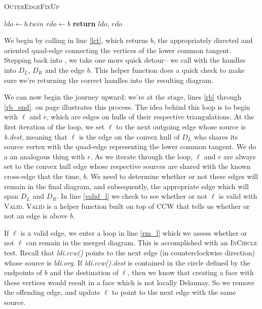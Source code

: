 \documentclass[12pt,twoside]{reedthesis}
\begin{document}
        \begin{algorithm}[H]
        \caption{\textsc{OuterEdgeFixUp}}\label{outer_edges}
        \begin{algorithmic}[1]
            \State $ldo\gets b.twin$
          \EndIf
            \State $rdo\gets b$
          \EndIf
          \State \textbf{return} $ldo$, $rdo$
        \EndProcedure
        \end{algorithmic} 
        \end{algorithm}

        We begin by calling  in line \ref{lct}, which returns $b$, the appropriately directed and oriented quad-edge connecting the vertices of the lower common tangent. Stepping back into , we take one more quick detour-- we call  with the handles into  $D_{L}$, $D_{R}$ and the edge $b$. This helper function does a quick check to make sure we're returning the correct handles into the resulting diagram.\par

        We can now begin the journey upward: we're at the  stage, lines \ref{rb} through \ref{rb_end}.  on page \pageref{fig:del_knit_all} illustrates this process. The idea behind this loop is to begin with $\ell$ and $r$, which are edges on hulls of their respective triangulations. At the first iteration of the loop, we set $\ell$ to the next outgoing edge whose source is \textit{b.dest}, meaning that $\ell$ is the edge on the convex hull of $D_{L}$ who shares its source vertex with the quad-edge representing the lower common tangent. We do a an analogous thing with $r$. As we iterate through the loop, $\ell$ and $r$ are always set to the convex hull edge whose respective sources are shared with the  known cross-edge that the time, $b$. We need to determine whether or not these edges will remain in the final diagram, and subsequently, the appropriate edge which will span $D_{L}$ and $D_{R}$. In line \ref{valid_l} we check to see whether or not $\ell$ is valid with \textsc{Valid}. \textsc{Valid} is a helper function built on top of \textsc{CCW} that tells us whether or not an edge is above $b$. 

        If $\ell$ is a valid edge, we enter a loop in line \ref{rm_l} which we assess whether or not $\ell$ can remain in the merged diagram. This is accomplished with an \textsc{InCircle} test. Recall that \textit{ldi.ccw()} points to the next edge (in counterclockwise direction) whose source is \textit{ldi.org}. If \textit{ldi.ccw().dest} is contained in the circle defined by the endpoints of $b$ and the destination of $\ell$, then we know that creating a face with these vertices would result in a face which is not locally Delaunay. So we remove the offending edge, and update $\ell$ to point to the next edge with the same source.\par
\end{document}
